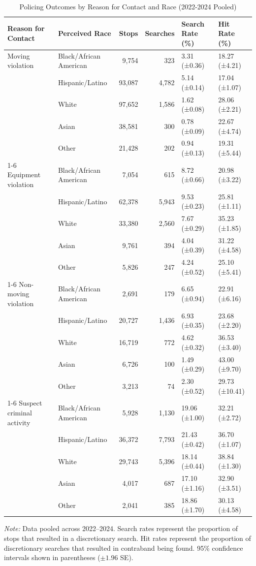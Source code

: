 \begin{table}[htbp]
\centering
\caption{Policing Outcomes by Reason for Contact and Race (2022-2024 Pooled)}
\label{tab:reason_for_contact}
\begin{tabular}{ll rr ll}
\toprule
Reason for Contact & Perceived Race & Stops & Searches & Search Rate (\%) & Hit Rate (\%) \\
\midrule
Moving violation & Black/African American & 9,754 & 323 & 3.31 (±0.36) & 18.27 (±4.21) \\
 & Hispanic/Latino & 93,087 & 4,782 & 5.14 (±0.14) & 17.04 (±1.07) \\
 & White & 97,652 & 1,586 & 1.62 (±0.08) & 28.06 (±2.21) \\
 & Asian & 38,581 & 300 & 0.78 (±0.09) & 22.67 (±4.74) \\
 & Other & 21,428 & 202 & 0.94 (±0.13) & 19.31 (±5.44) \\
\cmidrule(lr){1-6}
Equipment violation & Black/African American & 7,054 & 615 & 8.72 (±0.66) & 20.98 (±3.22) \\
 & Hispanic/Latino & 62,378 & 5,943 & 9.53 (±0.23) & 25.81 (±1.11) \\
 & White & 33,380 & 2,560 & 7.67 (±0.29) & 35.23 (±1.85) \\
 & Asian & 9,761 & 394 & 4.04 (±0.39) & 31.22 (±4.58) \\
 & Other & 5,826 & 247 & 4.24 (±0.52) & 25.10 (±5.41) \\
\cmidrule(lr){1-6}
Non-moving violation & Black/African American & 2,691 & 179 & 6.65 (±0.94) & 22.91 (±6.16) \\
 & Hispanic/Latino & 20,727 & 1,436 & 6.93 (±0.35) & 23.68 (±2.20) \\
 & White & 16,719 & 772 & 4.62 (±0.32) & 36.53 (±3.40) \\
 & Asian & 6,726 & 100 & 1.49 (±0.29) & 43.00 (±9.70) \\
 & Other & 3,213 & 74 & 2.30 (±0.52) & 29.73 (±10.41) \\
\cmidrule(lr){1-6}
Suspect criminal activity & Black/African American & 5,928 & 1,130 & 19.06 (±1.00) & 32.21 (±2.72) \\
 & Hispanic/Latino & 36,372 & 7,793 & 21.43 (±0.42) & 36.70 (±1.07) \\
 & White & 29,743 & 5,396 & 18.14 (±0.44) & 38.84 (±1.30) \\
 & Asian & 4,017 & 687 & 17.10 (±1.16) & 32.90 (±3.51) \\
 & Other & 2,041 & 385 & 18.86 (±1.70) & 30.13 (±4.58) \\
\bottomrule
\end{tabular}
\smallskip
\parbox{\textwidth}{\footnotesize \textit{Note:} Data pooled across 2022--2024. Search rates represent the proportion of stops that resulted in a discretionary search. Hit rates represent the proportion of discretionary searches that resulted in contraband being found. 95\% confidence intervals shown in parentheses ($\pm 1.96$ SE).}
\end{table}